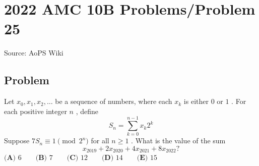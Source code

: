 \documentclass[12pt]{article}
\begin{document}
\section*{{2022 AMC 10B Problems/Problem 25}}
Source: AoPS Wiki

\subsection*{Problem}
Let $x_0,x_1,x_2,\dotsc$ be a sequence of numbers, where each $x_k$ is either $0$ or $1$ . For each positive integer $n$ , define \[S_n = \sum_{k=0}^{n-1} x_k 2^k\] Suppose $7S_n \equiv 1 \pmod{2^n}$ for all $n \geq 1$ . What is the value of the sum \[x_{2019} + 2x_{2020} + 4x_{2021} + 8x_{2022}?\] $\textbf{(A) } 6 \qquad \textbf{(B) } 7 \qquad \textbf{(C) }12\qquad \textbf{(D) } 14\qquad \textbf{(E) }15$
\end{document}
